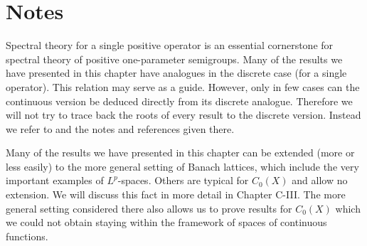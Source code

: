 \section*{Notes}
Spectral theory for a single positive operator is an essential cornerstone for spectral theory of positive one-parameter semigroups.
Many of the results we have presented in this chapter have analogues in the discrete case (\ie for a single operator).
This relation may serve as a guide.
However, only in few cases can the continuous version be deduced directly from its discrete analogue.
Therefore we will not try to trace back the roots of every result to the discrete version.
Instead we refer to \citet{schaefer:1974} and the notes and references given there.

Many of the results we have presented in this chapter can be extended (more or less easily) to the more general setting of Banach lattices, which include the very important examples of $L^p$-spaces.
Others are typical for $C_{0}(X)$ and allow no extension.
We will discuss this fact in more detail in Chapter C-III.
The more general setting considered there also allows us to prove results for $C_{0}(X)$ which we could not obtain staying within the framework of spaces of continuous functions.

